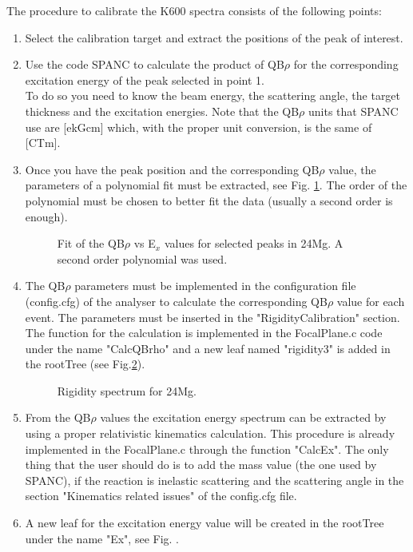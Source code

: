 \documentclass[11pt]{report}
\begin{document}
The procedure to calibrate the K600 spectra consists of the following points:
\begin{enumerate}
	\item Select the calibration target and extract the positions of the peak of interest.
	\item Use the code SPANC to calculate the product of QB$\rho$ for the corresponding excitation energy of the peak selected in point 1. \\To do so you need to know the beam energy, the scattering angle, the target thickness and the excitation energies. Note that the QB$\rho$ units that SPANC use are [ekGcm] which, with the proper unit conversion, is the same of [CTm]. 
	\item Once you have the peak position and the corresponding QB$\rho$ value, the parameters of a polynomial fit must be extracted, see Fig. \ref{fig:ExvsQBrho_fit}. The order of the polynomial must be chosen to better fit the data (usually a second order is enough).
	

\begin{figure}[b!]
	\centerline{\vspace{0cm}\hspace{0cm}
	}
	\centering
	\caption{Fit of the QB$\rho$ vs E$_x$ values for selected peaks in 24Mg. A second order polynomial was used.}
	\label{fig:ExvsQBrho_fit}
\end{figure}
	
	\item The QB$\rho$ parameters must be implemented in the configuration file (config.cfg) of the analyser to calculate the corresponding QB$\rho$ value for each event. The parameters must be inserted in the "RigidityCalibration" section. The function for the calculation is implemented in the FocalPlane.c code under the name "CalcQBrho" and a new leaf named "rigidity3" is added in the rootTree (see Fig.\ref{fig:rigidity3_24Mg}).
	
\begin{figure}
	\centerline{\vspace{0cm}\hspace{0cm}
	}
	\caption{Rigidity spectrum for 24Mg.}
	\label{fig:rigidity3_24Mg}
\end{figure}
	
	\item From the QB$\rho$ values the excitation energy spectrum can be extracted by using a proper relativistic kinematics calculation. This procedure is already implemented in the FocalPlane.c through the function "CalcEx". The only thing that the user should do is to add the mass value (the one used by SPANC), if the reaction is inelastic scattering and the scattering angle in the section "Kinematics related issues" of the config.cfg file.
	\item A new leaf for the excitation energy value will be created in the rootTree under the name "Ex", see Fig. .
\end{enumerate}
\end{document}

